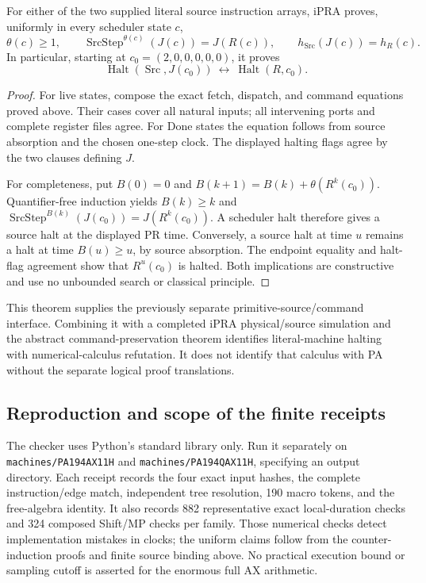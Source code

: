 \begin{theorem}
For either of the two supplied literal source instruction arrays,
$\mathrm{iPRA}$ proves, uniformly in every scheduler state $c$,
\[
 \theta(c)\ge1,\qquad
 \operatorname{SrcStep}^{\theta(c)}(J(c))=J(R(c)),\qquad
 h_{\mathrm{Src}}(J(c))=h_R(c).
\]
In particular, starting at $c_0=(2,0,0,0,0,0)$, it proves
\[
 \operatorname{Halt}(\operatorname{Src},J(c_0))
 \ \longleftrightarrow\ \operatorname{Halt}(R,c_0).
\]
\end{theorem}
\begin{proof}
For live states, compose the exact fetch, dispatch, and command equations
proved above.  Their cases cover all natural inputs; all intervening ports
and complete register files agree.  For Done states the equation follows
from source absorption and the chosen one-step clock.  The displayed
halting flags agree by the two clauses defining $J$.

For completeness, put $B(0)=0$ and
$B(k+1)=B(k)+\theta(R^k(c_0))$.  Quantifier-free induction yields
$B(k)\ge k$ and
$\operatorname{SrcStep}^{B(k)}(J(c_0))=J(R^k(c_0))$.
A scheduler halt therefore gives a source halt at the displayed PR time.
Conversely, a source halt at time $u$ remains a halt at time $B(u)\ge u$,
by source absorption.  The endpoint equality and halt-flag agreement show
that $R^u(c_0)$ is halted.  Both implications are constructive and use no
unbounded search or classical principle.
\end{proof}

This theorem supplies the previously separate primitive-source/command
interface.  Combining it with a completed iPRA physical/source simulation
and the abstract command-preservation theorem identifies literal-machine
halting with numerical-calculus refutation.  It does not identify that
calculus with PA without the separate logical proof translations.

\subsection{Reproduction and scope of the finite receipts}

The checker uses Python's standard library only.  Run it separately on
\texttt{machines/PA194AX11H} and \texttt{machines/PA194QAX11H}, specifying
an output directory.  Each receipt records the four exact input hashes,
the complete instruction/edge match, independent tree resolution,
190 macro tokens, and the free-algebra identity.  It also records 882
representative exact local-duration checks and 324 composed Shift/MP
checks per family.  Those numerical checks detect implementation mistakes
in clocks; the uniform claims follow from the counter-induction proofs
and finite source binding above.  No practical execution bound or
sampling cutoff is asserted for the enormous full AX arithmetic.
